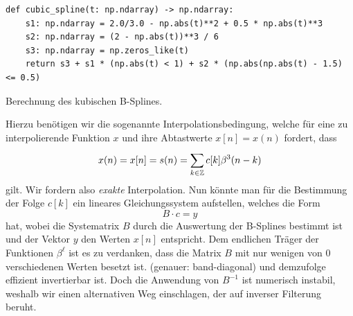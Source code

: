 \begin{listing}
\begin{verbatim}
def cubic_spline(t: np.ndarray) -> np.ndarray:
    s1: np.ndarray = 2.0/3.0 - np.abs(t)**2 + 0.5 * np.abs(t)**3
    s2: np.ndarray = (2 - np.abs(t))**3 / 6
    s3: np.ndarray = np.zeros_like(t)
    return s3 + s1 * (np.abs(t) < 1) + s2 * (np.abs(np.abs(t) - 1.5) <= 0.5)
\end{verbatim}
\caption{Berechnung des kubischen B-Splines.}\label{bsplines_eval}            
\end{listing}

Hierzu ben\"otigen wir die sogenannte Interpolationsbedingung, welche f\"ur eine zu interpolierende Funktion $x$ und ihre Abtastwerte $x[n] = x(n)$ fordert, dass
\begin{equation}\label{bsplines_interpol}
    x(n) = x[n] = s(n) = {\sum\limits_{k \in \mathbb{Z}}^{}{
        c[k] \beta^{3}(n - k)
    }}
\end{equation}
gilt. Wir fordern also \emph{exakte} Interpolation. Nun k\"onnte man f\"ur die Bestimmung der Folge $c[k]$ ein lineares Gleichungssystem aufstellen, welches die Form
%
\begin{equation}\label{bsplines_lse}
    B \cdot c = y
\end{equation}
%
hat, wobei die Systematrix $B$ durch die Auswertung der B-Splines bestimmt ist und der Vektor $y$ den Werten $x[n]$ entspricht. Dem endlichen Tr\"ager der Funktionen $\beta^\ell$ ist es zu verdanken, dass die Matrix $B$ mit nur wenigen von $0$ verschiedenen Werten besetzt ist. (genauer: band-diagonal) und demzufolge effizient invertierbar ist. Doch die Anwendung von $B^{-1}$ ist numerisch instabil, weshalb wir einen alternativen Weg einschlagen, der auf inverser Filterung beruht.

